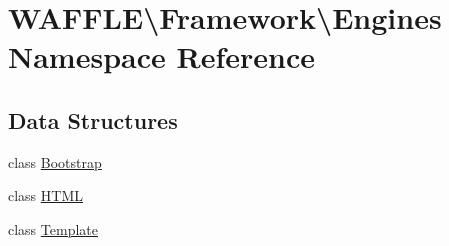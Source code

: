 \hypertarget{namespace_w_a_f_f_l_e_1_1_framework_1_1_engines}{}\section{W\+A\+F\+F\+LE\textbackslash{}Framework\textbackslash{}Engines Namespace Reference}
\label{namespace_w_a_f_f_l_e_1_1_framework_1_1_engines}
\subsection*{Data Structures}
\begin{DoxyCompactItemize}
\item 
class \hyperlink{class_w_a_f_f_l_e_1_1_framework_1_1_engines_1_1_bootstrap}{Bootstrap}
\item 
class \hyperlink{class_w_a_f_f_l_e_1_1_framework_1_1_engines_1_1_h_t_m_l}{H\+T\+ML}
\item 
class \hyperlink{class_w_a_f_f_l_e_1_1_framework_1_1_engines_1_1_template}{Template}
\end{DoxyCompactItemize}
